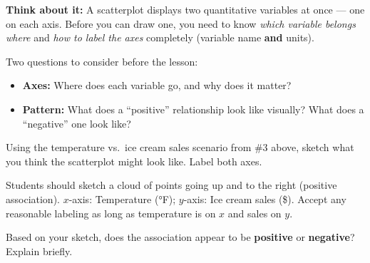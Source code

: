 \documentclass[10pt]{article}
\begin{document}
\begin{tcolorbox}[colback=greenbg, colframe=greenacc, boxrule=0.8pt, arc=2mm,
    left=4mm, right=4mm, top=3mm, bottom=3mm]
    \small
    \textbf{Think about it:} A scatterplot displays two quantitative variables at once ---
    one on each axis. Before you can draw one, you need to know \emph{which variable belongs
    where} and \emph{how to label the axes} completely (variable name \textbf{and} units).

    \vspace{6pt}
    Two questions to consider before the lesson:
    \begin{itemize}[leftmargin=1.3em, itemsep=4pt]
        \item \textbf{Axes:} Where does each variable go, and why does it matter?
        \item \textbf{Pattern:} What does a ``positive'' relationship look like visually?
              What does a ``negative'' one look like?
    \end{itemize}
\end{tcolorbox}

\vspace{0.16in}

\noindent Using the temperature vs.\ ice cream sales scenario from \#3 above, sketch what
you think the scatterplot might look like. Label both axes.

\begin{teachernote}
Students should sketch a cloud of points going up and to the right (positive association).
$x$-axis: Temperature (°F); $y$-axis: Ice cream sales (\$). Accept any reasonable labeling
as long as temperature is on $x$ and sales on $y$.
\end{teachernote}

\vspace{0.12in}

\begin{center}
\end{center}

\vspace{0.1in}

\noindent Based on your sketch, does the association appear to be \textbf{positive} or
\textbf{negative}? Explain briefly.\\[8pt]
\\[2pt]
\end{document}

